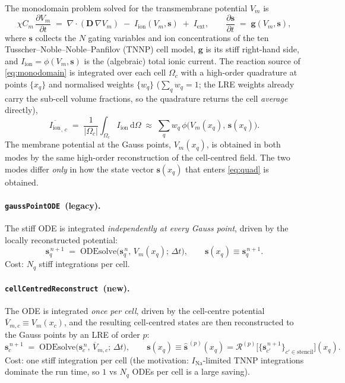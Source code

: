 \documentclass[11pt,a4paper]{article}
\newcommand{\Vm}{V_{m}}
\newcommand{\Iion}{I_{\text{ion}}}
\newcommand{\Iext}{I_{\text{ext}}}
\newcommand{\Dten}{\mathbf{D}}
\newcommand{\grad}{\nabla}
\newcommand{\divg}{\nabla\!\cdot}
\newcommand{\code}[1]{\texttt{\small #1}}
\newcommand{\gpode}{\code{gaussPointODE}}
\newcommand{\ccrec}{\code{cellCentredReconstruct}}
\newcommand{\states}{\mathbf{s}}
\newcommand{\Vbarc}{\overline{V}_{m,c}}
\newcommand{\Omegac}{\Omega_{c}}
\begin{document}
The monodomain problem solved for the transmembrane potential $\Vm$ is
\begin{equation}
  \chi C_m \,\frac{\partial \Vm}{\partial t}
  \;=\; \divg\!\left(\Dten\,\grad \Vm\right)
        \;-\; \Iion(\Vm,\states) \;+\; \Iext ,
  \qquad
  \frac{\partial \states}{\partial t} \;=\; \mathbf{g}(\Vm,\states),
  \label{eq:monodomain}
\end{equation}
where $\states$ collects the $N$ gating variables and ion concentrations of the
ten Tusscher--Noble--Noble--Panfilov (TNNP) cell model, $\mathbf{g}$ is its stiff
right-hand side, and $\Iion=\phi(\Vm,\states)$ is the (algebraic) total ionic
current. The reaction source of \eqref{eq:monodomain} is integrated over each
cell $\Omegac$ with a high-order quadrature at points $\{x_q\}$ and normalised
weights $\{w_q\}$ ($\sum_q w_q=1$; the LRE weights already carry the sub-cell
volume fractions, so the quadrature returns the cell \emph{average} directly),
\begin{equation}
  \overline{\Iion}_{,\,c}
  \;=\; \frac{1}{|\Omegac|}\int_{\Omegac} \Iion \,\mathrm{d}\Omega
  \;\approx\; \sum_{q} w_q\,\phi\!\big(\Vm(x_q),\,\states(x_q)\big).
  \label{eq:quad}
\end{equation}
The membrane potential at the Gauss points, $\Vm(x_q)$, is obtained in both modes
by the same high-order reconstruction of the cell-centred field. The two modes
differ \emph{only} in how the state vector $\states(x_q)$ that enters
\eqref{eq:quad} is obtained.

\paragraph{\gpode\ (legacy).}
The stiff ODE is integrated \emph{independently at every Gauss point}, driven by
the locally reconstructed potential:
\begin{equation}
  \states_q^{\,n+1}
  \;=\; \mathrm{ODEsolve}\!\big(\states_q^{\,n},\,\Vm(x_q);\,\Delta t\big),
  \qquad
  \states(x_q) \equiv \states_q^{\,n+1}.
  \label{eq:gp}
\end{equation}
Cost: $N_q$ stiff integrations per cell.

\paragraph{\ccrec\ (new).}
The ODE is integrated \emph{once per cell}, driven by the cell-centre potential
$\Vbarc \equiv \Vm(x_c)$, and the resulting cell-centred states are then
reconstructed to the Gauss points by an LRE of order $p$:
\begin{equation}
  \states_c^{\,n+1}
  \;=\; \mathrm{ODEsolve}\!\big(\states_c^{\,n},\,\Vbarc;\,\Delta t\big),
  \qquad
  \states(x_q) \equiv \widehat{\states}^{\,(p)}(x_q)
        = \mathcal{R}^{(p)}\!\big[\{\states_{c'}^{\,n+1}\}_{c'\in\text{stencil}}\big](x_q).
  \label{eq:cc}
\end{equation}
Cost: one stiff integration per cell (the motivation: $I_{\mathrm{Na}}$-limited
TNNP integrations dominate the run time, so $1$ vs $N_q$ ODEs per cell is a large
saving).
\end{document}
